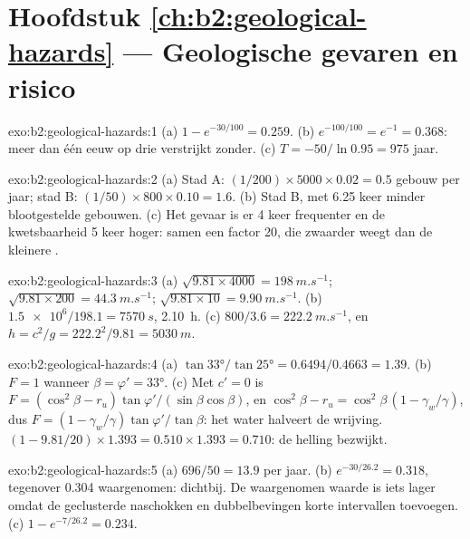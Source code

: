 \section*{Hoofdstuk \ref{ch:b2:geological-hazards} --- Geologische gevaren en risico}

\begin{solution}{exo:b2:geological-hazards:1}
(a) $1 - e^{-30/100} = 0.259$. (b) $e^{-100/100} = e^{-1} = 0.368$: meer dan één eeuw op drie
verstrijkt zonder. (c) $T = -50/\ln 0.95 = 975$ jaar.
\end{solution}

\begin{solution}{exo:b2:geological-hazards:2}
(a) Stad A: $(1/200) \times 5000 \times 0.02 = 0.5$ gebouw per jaar; stad B: $(1/50) \times 800
\times 0.10 = 1.6$. (b) Stad B, met 6.25 keer minder blootgestelde gebouwen. (c) Het gevaar is er 4 keer
frequenter en de kwetsbaarheid 5 keer hoger: samen een factor 20, die zwaarder weegt dan de
kleinere .
\end{solution}

\begin{solution}{exo:b2:geological-hazards:3}
(a) $\sqrt{9.81 \times 4000} = \qty{198}{m.s^{-1}}$; $\sqrt{9.81 \times 200} = \qty{44.3}{m.s^{-1}}$;
$\sqrt{9.81 \times 10} = \qty{9.90}{m.s^{-1}}$. (b) $\num{1.5e6}/198.1 = \qty{7570}{s}$, \qty{2.10}{h}.
(c) $800/3.6 = \qty{222.2}{m.s^{-1}}$, en $h = c^2/g = 222.2^2/9.81 = \qty{5030}{m}$.
\end{solution}

\begin{solution}{exo:b2:geological-hazards:4}
(a) $\tan\ang{33}/\tan\ang{25} = 0.6494/0.4663 = 1.39$. (b) $F = 1$ wanneer $\beta = \varphi' =
\ang{33}$. (c) Met $c' = 0$ is $F = (\cos^2\beta - r_u)\tan\varphi'/(\sin\beta\cos\beta)$, en $\cos^2\beta
- r_u = \cos^2\beta\,(1 - \gamma_w/\gamma)$, dus $F = (1 - \gamma_w/\gamma)\tan\varphi'/\tan\beta$:
het water halveert de wrijving. $(1 - 9.81/20) \times 1.393 = 0.510 \times 1.393 = 0.710$: de
helling bezwijkt.
\end{solution}

\begin{solution}{exo:b2:geological-hazards:5}
(a) $696/50 = 13.9$ per jaar. (b) $e^{-30/26.2} = 0.318$, tegenover 0.304 waargenomen: dichtbij. De
waargenomen waarde is iets lager omdat de geclusterde naschokken en dubbelbevingen korte
intervallen toevoegen. (c) $1 - e^{-7/26.2} = 0.234$.
\end{solution}

